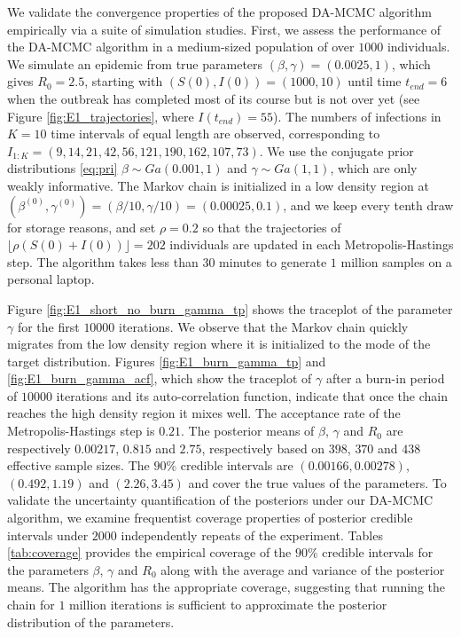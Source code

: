\documentclass[11pt]{article}
\begin{document}
	We validate the convergence properties of the proposed DA-MCMC algorithm empirically via a suite of simulation studies. First, we assess the performance of the DA-MCMC algorithm in a medium-sized population of over $1000$ individuals. We simulate an epidemic from true parameters $(\beta, \gamma) = (0.0025, 1)$, which gives $R_0 = 2.5$, starting with $(S(0), I(0)) = (1000, 10)$ until time $t_{end} = 6$ when the outbreak has completed most of its course but is not over yet (see Figure \ref{fig:E1_trajectories}, where $I(t_{end}) = 55$). The numbers of infections in $K = 10$ time intervals of equal length are observed, corresponding to $I_{1:K} = (9, 14, 21, 42, 56, 121, 190, 162, 107, 73)$.	
	We use the conjugate prior distributions \ref{eq:pri} $\beta \sim Ga(0.001, 1)$ and $\gamma \sim Ga(1,1)$, which are only weakly informative.
	The Markov chain is initialized in a low density region at $(\beta^{(0)}, \gamma^{(0)}) = (\beta/10, \gamma/10) = (0.00025, 0.1)$, and we keep every tenth draw for storage reasons, and set $\rho = 0.2$ so that the trajectories of $\lfloor\rho (S(0)+I(0))\rfloor = 202$ individuals are updated in each Metropolis-Hastings step. The algorithm takes less than $30$ minutes to generate $1$ million samples on a personal laptop. 
	
	Figure \ref{fig:E1_short_no_burn_gamma_tp} shows the traceplot of the parameter $\gamma$ for the first $10000$ iterations. We observe that the Markov chain quickly migrates from the low density region where it is initialized to the mode of the target distribution. Figures  \ref{fig:E1_burn_gamma_tp} and \ref{fig:E1_burn_gamma_acf}, which show the traceplot of $\gamma$ after a burn-in period of $10000$ iterations and its auto-correlation function, indicate that once the chain reaches the high density region it mixes well. The acceptance rate of the Metropolis-Hastings step is $0.21$.
	The posterior means of $\beta$, $\gamma$ and $R_0$ are respectively $0.00217$, $0.815$ and $2.75$, respectively based on $398$, $370$ and $438$ effective sample sizes. The $90\%$ credible intervals are $(0.00166, 0.00278)$, $(0.492, 1.19)$ and $(2.26, 3.45)$ and cover the true values of the parameters. To validate the uncertainty quantification of the posteriors under our DA-MCMC algorithm, we examine frequentist coverage properties of posterior credible intervals under $2000$ independently repeats of the experiment. Tables \ref{tab:coverage} provides the empirical coverage of the $90\%$ credible intervals for the parameters $\beta$, $\gamma$ and $R_0$ along with the average and variance of the posterior means. The algorithm has the appropriate coverage, suggesting that running the chain for $1$ million iterations is sufficient to approximate the posterior distribution of the parameters.
	
\end{document}
